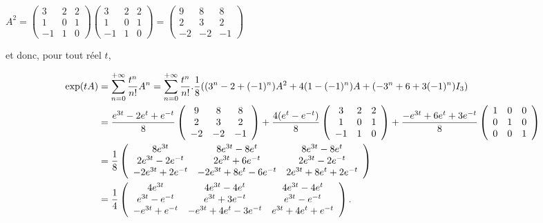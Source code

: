 {\begin{enumerate}
{\begin{center}
$A^2=\left(
\begin{array}{ccc}
3&2&2\\
1&0&1\\
-1&1&0
\end{array}
\right)\left(
\begin{array}{ccc}
3&2&2\\
1&0&1\\
-1&1&0
\end{array}
\right)=\left(
\begin{array}{ccc}
9&8&8\\
2&3&2\\
-2&-2&-1
\end{array}
\right)$
\end{center}

et donc, pour tout réel $t$,

\begin{align*}\ensuremath
\text{exp}(tA)&=\sum_{n=0}^{+\infty} \frac{t^n}{n!}A^n=\sum_{n=0}^{+\infty} \frac{t^n}{n!}. \frac{1}{8}((3^n-2+(-1)^n)A^2+4(1-(-1)^n)A+(-3^n+6+3(-1)^n)I_3)\\
 &= \frac{e^{3t}-2e^t+e^{-t}}{8}\left(
\begin{array}{ccc}
9&8&8\\
2&3&2\\
-2&-2&-1
\end{array}
\right)+ \frac{4(e^t-e^{-t})}{8}\left(
\begin{array}{ccc}
3&2&2\\
1&0&1\\
-1&1&0
\end{array}
\right)+ \frac{-e^{3t}+6e^t+3e^{-t}}{8}\left(
\begin{array}{ccc}
1&0&0\\
0&1&0\\
0&0&1
\end{array}
\right)\\
&= \frac{1}{8}\left(
\begin{array}{ccc}
8e^{3t}&8e^{3t}-8e^t&8e^{3t}-8e^t\\
2e^{3t}-2e^{-t}&2e^{3t}+6e^{-t}&2e^{3t}-2e^{-t}\\
-2e^{3t}+2e^{-t}&-2e^{3t}+8e^t-6e^{-t}&2e^{3t}+8e^t+2e^{-t}
\end{array}
\right)\\
 &= \frac{1}{4}\left(
\begin{array}{ccc}
4e^{3t}&4e^{3t}-4e^t&4e^{3t}-4e^t\\
e^{3t}-e^{-t}&e^{3t}+3e^{-t}&e^{3t}-e^{-t}\\
-e^{3t}+e^{-t}&-e^{3t}+4e^t-3e^{-t}&e^{3t}+4e^t+e^{-t}
\end{array}
\right).
\end{align*}

}
\end{enumerate}}
